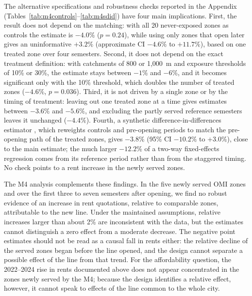 The alternative specifications and robustness checks reported in the Appendix (Tables~\ref{tab:m4controls}--\ref{tab:m4sdid}) have four main implications. First, the result does not depend on the matching: with all 20 never-exposed zones as controls the estimate is $-4.0\%$ ($p=0.24$), while using only zones that open later gives an uninformative $+3.2\%$ (approximate CI $-4.6\%$ to $+11.7\%$), based on one treated zone over four semesters. Second, it does not depend on the exact treatment definition: with catchments of 800 or 1,000~m and exposure thresholds of 10\% or 30\%, the estimate stays between $-1\%$ and $-6\%$, and it becomes significant only with the 10\% threshold, which doubles the number of treated zones ($-4.6\%$, $p=0.036$). Third, it is not driven by a single zone or by the timing of treatment: leaving out one treated zone at a time gives estimates between $-3.6\%$ and $-5.6\%$, and excluding the partly served reference semesters leaves it unchanged ($-4.4\%$). Fourth, a synthetic difference-in-differences estimator \cite{arkhangelsky2021}, which reweights controls and pre-opening periods to match the pre-opening path of the treated zones, gives $-3.8\%$ (95\% CI $-10.2\%$ to $+3.0\%$), close to the main estimate; the much larger $-12.2\%$ of a two-way fixed-effects regression comes from its reference period rather than from the staggered timing. No check points to a rent increase in the newly served zones.



The M4 analysis complements these findings. %
In the five newly served OMI zones and over the first three to seven semesters after opening, we find no robust evidence of an increase in rent quotations, relative to comparable zones, attributable to the new line. Under the maintained assumptions, relative increases larger than about 2\% are inconsistent with the data, but the estimates cannot distinguish a zero effect from a moderate decrease. The negative point estimates should not be read as a causal fall in rents either: the relative decline of the served zones began before the line opened, and the design cannot separate a possible effect of the line from that trend. For the affordability question, the 2022--2024 rise in rents documented above does not appear concentrated in the zones newly served by the M4; because the design identifies a relative effect, however, it cannot speak to effects of the line common to the whole city.

